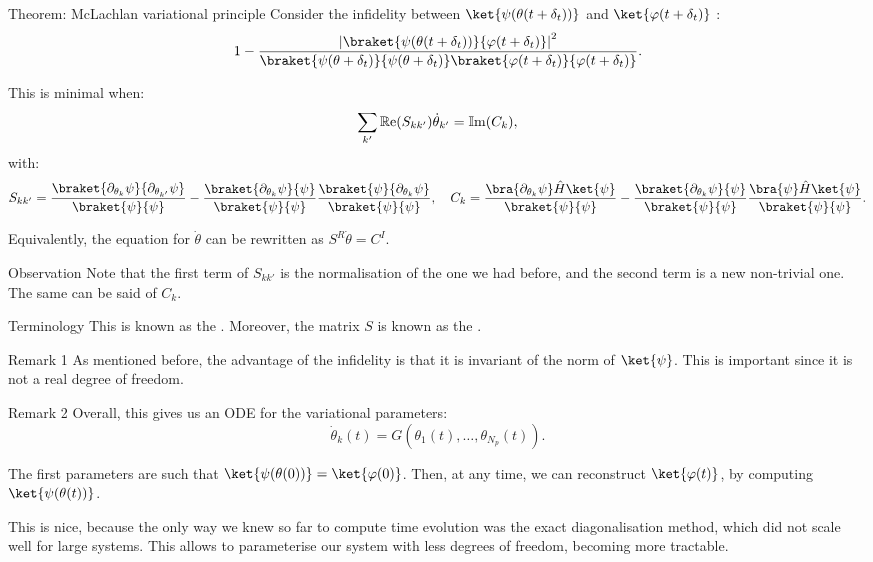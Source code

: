 \documentclass[a4paper]{article}
\begin{document}
\begin{parag}{Theorem: McLachlan variational principle}
    Consider the infidelity between $\ket{\psi\left(\theta\left(t + \delta_t\right)\right)}$ and $\ket{\phi\left(t + \delta_t\right)}$ :
    \[1 - \frac{\left|\braket{\psi\left(\theta\left(t+\delta_t\right)\right)}{\phi\left(t + \delta_t\right)}\right|^2}{\braket{\psi\left(\theta+\delta_t\right)}{\psi\left(\theta + \delta_t\right)} \braket{\phi\left(t+\delta_t\right)}{\phi\left(t + \delta_t\right)}}. \]

    This is minimal when:
    \[\sum_{k'} \cre\left(S_{k k'}\right) \dot{\theta}_{k'} = \cim\left(C_k\right),\]
    with: 
    \[S_{k k'} = \frac{\braket{\partial_{\theta_k}\psi}{\partial_{\theta_{k'}}\psi}}{\braket{\psi}{\psi}} - \frac{\braket{\partial_{\theta_k}\psi}{\psi}}{\braket{\psi}{\psi}} \frac{\braket{\psi}{\partial_{\theta_k} \psi}}{\braket{\psi}{\psi}}, \mathspace C_k = \frac{\bra{\partial_{\theta_k}\psi} \hat{H} \ket{\psi}}{\braket{\psi}{\psi}} - \frac{\braket{\partial_{\theta_k}\psi}{\psi}}{\braket{\psi}{\psi}} \frac{\bra{\psi} \hat{H}\ket{\psi}}{\braket{\psi}{\psi}}.\]

    Equivalently, the equation for $\dot{\theta}$ can be rewritten as $S^R \dot{\theta} = C^I$.

    \begin{subparag}{Observation}
        Note that the first term of $S_{k k'}$ is the normalisation of the one we had before, and the second term is a new non-trivial one. The same can be said of $C_k$.
    \end{subparag}

    \begin{subparag}{Terminology}
        This is known as the . Moreover, the matrix $S$ is known as the .
    \end{subparag}

    \begin{subparag}{Remark 1}
        As mentioned before, the advantage of the infidelity is that it is invariant of the norm of $\ket{\psi}$. This is important since it is not a real degree of freedom.
    \end{subparag}

    \begin{subparag}{Remark 2}
        Overall, this gives us an ODE for the variational parameters:
        \[\dot{\theta}_k\left(t\right) = G\left(\theta_1\left(t\right), \ldots, \theta_{N_p}\left(t\right)\right).\]

        The first parameters are such that $\ket{\psi\left(\theta\left(0\right)\right)} = \ket{\phi\left(0\right)}$. Then, at any time, we can reconstruct $\ket{\phi\left(t\right)}$, by computing $\ket{\psi\left(\theta\left(t\right)\right)}$.

        This is nice, because the only way we knew so far to compute time evolution was the exact diagonalisation method, which did not scale well for large systems. This allows to parameterise our system with less degrees of freedom, becoming more tractable.
    \end{subparag}
\end{parag}
\end{document}
